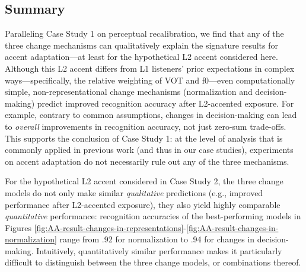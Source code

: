 \documentclass[
  11pt,
  man,floatsintext]{apa6}
\begin{document}
\subsection{Summary}\label{summary-1}

Paralleling Case Study 1 on perceptual recalibration, we find that any of the three change mechanisms can qualitatively explain the signature results for accent adaptation---at least for the hypothetical L2 accent considered here. Although this L2 accent differs from L1 listeners' prior expectations in complex ways---specifically, the relative weighting of VOT and f0---even computationally simple, non-representational change mechanisms (normalization and decision-making) predict improved recognition accuracy after L2-accented exposure. For example, contrary to common assumptions, changes in decision-making can lead to \emph{overall} improvements in recognition accuracy, not just zero-sum trade-offs. This supports the conclusion of Case Study 1: at the level of analysis that is commonly applied in previous work (and thus in our case studies), experiments on accent adaptation do not necessarily rule out any of the three mechanisms.

For the hypothetical L2 accent considered in Case Study 2, the three change models do not only make similar \emph{qualitative} predictions (e.g., improved performance after L2-accented exposure), they also yield highly comparable \emph{quantitative} performance: recognition accuracies of the best-performing models in Figures \ref{fig:AA-result-changes-in-representations}-\ref{fig:AA-result-changes-in-normalization} range from .92 for normalization to .94 for changes in decision-making. Intuitively, quantitatively similar performance makes it particularly difficult to distinguish between the three change models, or combinations thereof.
\end{document}

